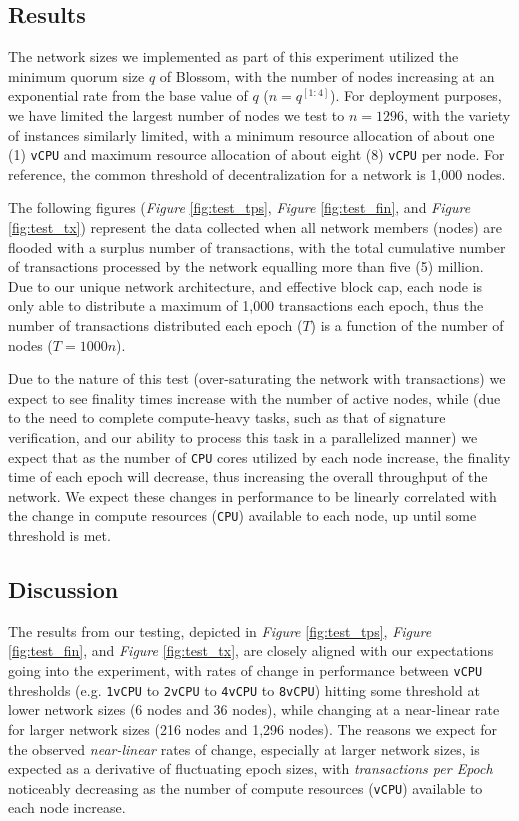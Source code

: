 \subsection{Results}\label{bench:res}
The network sizes we implemented as part of this experiment utilized the minimum quorum size $q$ of Blossom, with the number of nodes increasing at an exponential rate from the base value of $q$ (\(n = q^{[1:4]}\)). For deployment purposes, we have limited the largest number of nodes we test to \(n=1296\), with the variety of instances similarly limited, with a minimum resource allocation of about one (1) \texttt{vCPU} and maximum resource allocation of about eight (8) \texttt{vCPU} per node. For reference, the common threshold of decentralization for a network is 1,000 nodes.

The following figures (\textit{Figure} \ref{fig:test_tps}, \textit{Figure} \ref{fig:test_fin}, and \textit{Figure} \ref{fig:test_tx}) represent the data collected when all network members (nodes) are flooded with a surplus number of transactions, with the total cumulative number of transactions processed by the network equalling more than five (5) million. Due to our unique network architecture, and effective block cap, each node is only able to distribute a maximum of 1,000 transactions each epoch, thus the number of transactions distributed each epoch ($T$) is a function of the number of nodes (\(T=1000n\)).

Due to the nature of this test (over-saturating the network with transactions) we expect to see finality times increase with the number of active nodes, while (due to the need to complete compute-heavy tasks, such as that of signature verification, and our ability to process this task in a parallelized manner) we expect that as the number of \texttt{CPU} cores utilized by each node increase, the finality time of each epoch will decrease, thus increasing the overall throughput of the network. We expect these changes in performance to be linearly correlated with the change in compute resources (\texttt{CPU}) available to each node, up until some threshold is met.





\subsection{Discussion}\label{bench:dis}
The results from our testing, depicted in \textit{Figure} \ref{fig:test_tps}, \textit{Figure} \ref{fig:test_fin}, and \textit{Figure} \ref{fig:test_tx}, are closely aligned with our expectations going into the experiment, with rates of change in performance between \texttt{vCPU} thresholds (e.g. \texttt{1vCPU} to \texttt{2vCPU} to \texttt{4vCPU} to \texttt{8vCPU}) hitting some threshold at lower network sizes (6 nodes and 36 nodes), while changing at a near-linear rate for larger network sizes (216 nodes and 1,296 nodes). The reasons we expect for the observed \textit{near-linear} rates of change, especially at larger network sizes, is expected as a derivative of fluctuating epoch sizes, with \textit{transactions per Epoch} noticeably decreasing as the number of compute resources (\texttt{vCPU}) available to each node increase.

